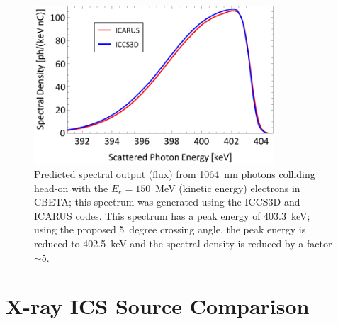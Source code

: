 \documentclass[../main.tex]{subfiles}
\begin{document}
\begin{figure}[!h]
\centering
\includegraphics[width=0.8\textwidth]{Figures/CBETA_Inverse_Compton_Source_Design/cbetaspectrumplot_final.pdf}
\caption{Predicted spectral output (flux) from 1064~nm photons colliding head-on with the $E_e =150$~MeV (kinetic energy) electrons in CBETA; this spectrum was generated using the \textsc{ICCS3D} and \textsc{ICARUS} codes. This spectrum has a peak energy of 403.3~keV; using the proposed 5~degree crossing angle, the peak energy is reduced to 402.5~keV and the spectral density is reduced by a factor $\sim$5.}
\label{fig:CBETA_spectrum_benchmarking}
\end{figure}

\section{X-ray ICS Source Comparison}
\end{document}
